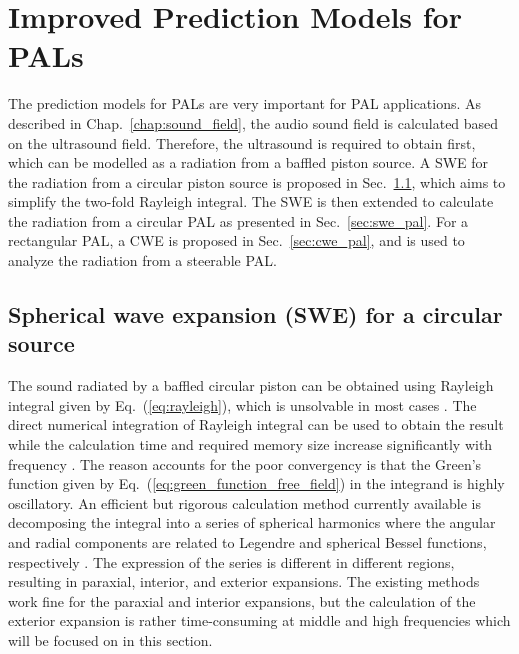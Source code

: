 \chapter{Improved Prediction Models for PALs} %
\label{chap:predict_model} %

\noindent The prediction models for PALs are very important for PAL applications.
As described in Chap.~\ref{chap:sound_field}, the audio sound field is calculated based on the ultrasound field.
Therefore, the ultrasound is required to obtain first, which can be modelled as a radiation from a baffled piston source.
A SWE for the radiation from a circular piston source is proposed in Sec.~\ref{Section41}, which aims to simplify the two-fold Rayleigh integral.
The SWE is then extended to calculate the radiation from a circular PAL as presented in Sec.~\ref{sec:swe_pal}.
For a rectangular PAL, a CWE is proposed in Sec.~\ref{sec:cwe_pal}, and is used to analyze the radiation from a steerable PAL.

\section{Spherical wave expansion (SWE) for a circular source}
\label{Section41}

The sound radiated by a baffled circular piston can be obtained using Rayleigh integral given by Eq.~(\ref{eq:rayleigh}), which is unsolvable in most cases \cite{Mast2005SimplifiedExpansionsRadiation}. 
The direct numerical integration of Rayleigh integral can be used to obtain the result while the calculation time and required memory size increase significantly with frequency \cite{Zemanek1971BeamBehaviorNearfield}.
The reason accounts for the poor convergency is that the Green's function given by Eq.~(\ref{eq:green_function_free_field}) in the integrand is highly oscillatory.
An efficient but rigorous calculation method currently available is decomposing the integral into a series of spherical harmonics where the angular and radial components are related to Legendre and spherical Bessel functions, respectively \cite{Mast2005SimplifiedExpansionsRadiation, Poletti2018SphericalExpansionsSound}. 
The expression of the series is different in different regions, resulting in paraxial, interior, and exterior expansions. 
The existing methods work fine for the paraxial and interior expansions, but the calculation of the exterior expansion is rather time-consuming at middle and high frequencies which will be focused on in this section. 


